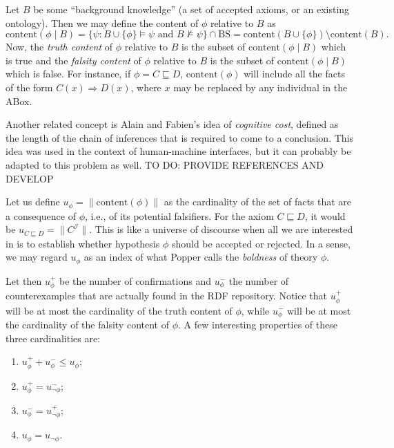 \documentclass[a4paper]{article}
\newcounter{ex}
\begin{document}
Let $B$ be some ``background knowledge'' (a set of accepted axioms, or an existing ontology).
Then we may define the content of $\phi$ relative to $B$ as
\begin{equation}\label{eq:relative-content}
  \mathrm{content}(\phi \mid B) = \{\psi : B \cup \{\phi\} \models \psi \mbox{ and } B \not\models \psi\} \cap \mathrm{BS}
  = \mathrm{content}(B \cup \{\phi\}) \setminus \mathrm{content}(B).
\end{equation}
Now, the \emph{truth content} of $\phi$ relative to $B$ is the subset
of $\mathrm{content}(\phi \mid B)$ which is true and the \emph{falsity content}
of $\phi$ relative to $B$ is the subset of $\mathrm{content}(\phi \mid B)$ which
is false.
For instance, if $\phi = C \sqsubseteq D$, $\mathrm{content}(\phi)$ will include
all the facts of the form $C(x) \Rightarrow D(x)$, where $x$ may be replaced by
any individual in the ABox.

Another related concept is Alain and Fabien's idea of \emph{cognitive cost},
defined as the length of the chain of inferences that is required to come to a
conclusion. This idea was used in the context of human-machine interfaces,
but it can probably be adapted to this problem as well.
TO DO: PROVIDE REFERENCES AND DEVELOP

Let us define $u_\phi = \|\mathrm{content}(\phi)\|$ as the cardinality of the
set of facts that are a consequence of $\phi$, i.e., of its potential falsifiers.
For the axiom $C \sqsubseteq D$, it would be $u_{C \sqsubseteq D} = \|C^\mathcal{I}\|$.
This is like a universe of discourse when all we are interested in is to establish
whether hypothesis $\phi$ should be accepted or rejected.
In a sense, we may regard $u_\phi$ as an index of what Popper calls the \emph{boldness}
of theory $\phi$.

Let then $u_\phi^+$ be the number of confirmations and $u_\phi^-$ the number of counterexamples
that are actually found in the RDF repository.
Notice that $u_\phi^+$ will be at most the cardinality of the truth content of $\phi$,
while $u_\phi^-$ will be at most the cardinality of the falsity content of $\phi$.
A few interesting properties of these three cardinalities are:
\begin{enumerate}
\item $u_\phi^+ + u_\phi^- \leq u_\phi$;
\item $u_\phi^+ = u_{\neg\phi}^-$;
\item $u_\phi^- = u_{\neg\phi}^+$;
\item $u_\phi = u_{\neg\phi}$.
\end{enumerate}
\end{document}
